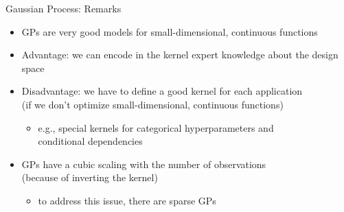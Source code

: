 \begin{frame}[c]{Gaussian Process: Remarks}

\begin{itemize}
	\item GPs are very good models for small-dimensional, continuous functions
	\item Advantage: we can encode in the kernel expert knowledge about the design space
	\pause
	\item Disadvantage: we have to define a good kernel for each application\\ (if we don't optimize small-dimensional, continuous functions) 
	\begin{itemize}
		 \item e.g., special kernels for categorical hyperparameters and\\ conditional dependencies
	\end{itemize}
	\smallskip
	\pause
	\item GPs have a cubic scaling with the number of observations\\ (because of inverting the kernel)
	\begin{itemize}
		\item to address this issue, there are sparse GPs\\ 
	\end{itemize}
\end{itemize}

\end{frame}
